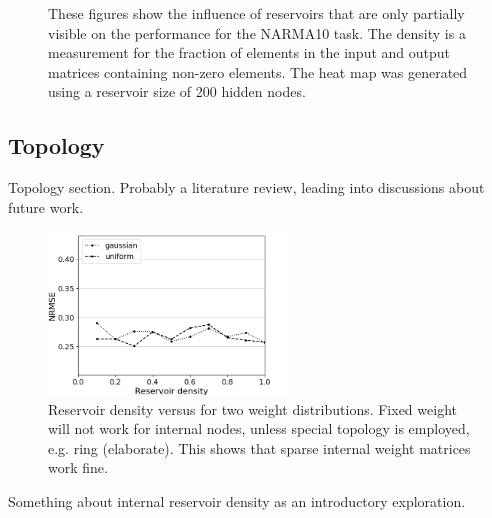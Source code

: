 \begin{figure}[htbp]
\begin{subfigure}{.3\textwidth}
    \caption{}
  \end{subfigure}
  \caption{
    These figures show the influence of reservoirs that are only partially
visible on the performance for the NARMA10 task. The density is a measurement
for the fraction of elements in the input and output matrices containing
non-zero elements. The heat map was generated using a reservoir size of 200
hidden nodes.
  }
  \label{partial_visibility}
\end{figure}


\subsection{Topology}

Topology section. Probably a literature review, leading into discussions about
future work.

\begin{figure}[H]
  \centering
  \includegraphics[width=2.5in]{img/reservoir_density_distrib.png}
  \caption{
    Reservoir density versus for two weight distributions. Fixed weight will not
work for internal nodes, unless special topology is employed, e.g. ring
(elaborate). This shows that sparse internal weight matrices work fine.
  }
  \label{reservoir_density_distrib}
\end{figure}

Something about internal reservoir density as an introductory exploration.


